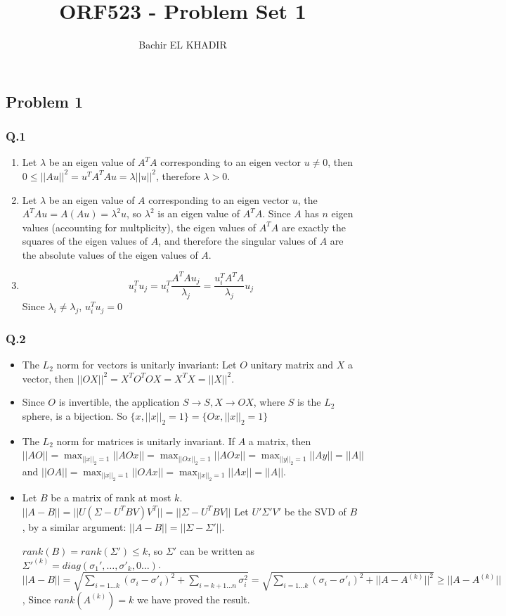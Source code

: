 \documentclass[12pt]{article}
\title{ORF523 - Problem Set 1}
\author{Bachir EL KHADIR }
\newcommand{\Problem}[1]{\subsection*{Problem #1}}
\newcommand{\Q}[1]{\subsubsection*{Q.#1}}
\begin{document}
\maketitle

\Problem{1}

\Q{1}

\begin{enumerate}
\item Let $\lambda$ be an eigen value of $A^TA$ corresponding to an eigen vector $u \ne 0$, then $0 \le ||Au||^2 = u^TA^TAu = \lambda ||u||^2$, therefore $\lambda > 0$.
\item Let $\lambda$ be an eigen value of $A$ corresponding to an eigen vector $u$, the $A^TAu = A(Au) = \lambda^2 u$, so $\lambda^2$ is an eigen value of $A^TA$. Since $A$ has $n$ eigen values (accounting for multplicity), the eigen values of $A^TA$ are exactly the squares of the eigen values of $A$, and therefore the singular values of $A$ are the absolute values of the eigen values of $A$.

\item
  $$u_i^Tu_j = u_i^T\frac{A^TAu_j}{\lambda_j} = \frac{u_i^TA^TA}{\lambda_j}u_j$$
  Since $\lambda_i \ne \lambda_j$, $u_i^Tu_j = 0$
\end{enumerate}

\Q{2}
\begin{itemize}
\item The $L_2$ norm for vectors is unitarly invariant:
  Let $O$ unitary matrix and $X$ a vector, then $||OX||^2  = X^TO^TOX = X^TX = ||X||^2$.
\item Since $O$ is invertible, the application $S \rightarrow S, X \rightarrow OX$, where $S$ is the $L_2$ sphere, is a bijection. So   $\{ x, ||x||_2 = 1\} = \{ Ox, ||x||_2 = 1\}$
\item The $L_2$ norm for matrices is unitarly invariant.
  If $A$ a matrix, then $||AO|| = \max_{||x||_2 = 1} ||AOx|| = \max_{||Ox||_2 = 1} ||AOx|| = \max_{||y||_2 = 1} ||Ay|| = ||A||$ and
  $||OA|| = \max_{||x||_2 = 1} ||OAx|| = \max_{||x||_2 = 1} ||Ax|| = ||A||$.
\item
  Let $B$ be a matrix of rank at most $k$.
  $||A - B|| = ||U(\Sigma - U^TBV)V^T|| = ||\Sigma - U^TBV||$
  Let $U'\Sigma'V'$ be the SVD of $B$, by a similar argument: $||A - B|| = ||\Sigma - \Sigma'||$.
  
  $rank(B) = rank(\Sigma') \le k$, so $\Sigma'$ can be written as $\Sigma'^{(k)} = diag(\sigma_1', \ldots, \sigma'_k, 0 \ldots )$.
  $||A - B|| = \sqrt{\sum_{i = 1 ... k} (\sigma_i - \sigma'_i)^2 + \sum_{i = k+1 \ldots n} \sigma_i^2}
  = \sqrt{\sum_{i = 1 ... k} (\sigma_i - \sigma'_i)^2 + ||A - A^{(k)}||^2} \ge ||A - A^{(k)}||$,
  Since $rank(A^{(k)}) = k$ we have proved the result.
\end{itemize}
\end{document}
